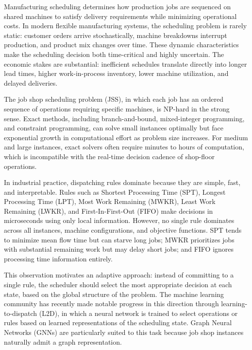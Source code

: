 \documentclass{article}
\begin{document}
Manufacturing scheduling determines how production jobs are sequenced on shared machines to satisfy delivery requirements while minimizing operational costs. In modern flexible manufacturing systems, the scheduling problem is rarely static: customer orders arrive stochastically, machine breakdowns interrupt production, and product mix changes over time. These dynamic characteristics make the scheduling decision both time-critical and highly uncertain. The economic stakes are substantial: inefficient schedules translate directly into longer lead times, higher work-in-process inventory, lower machine utilization, and delayed deliveries.

The job shop scheduling problem (JSS), in which each job has an ordered sequence of operations requiring specific machines, is NP-hard in the strong sense. Exact methods, including branch-and-bound, mixed-integer programming, and constraint programming, can solve small instances optimally but face exponential growth in computational effort as problem size increases. For medium and large instances, exact solvers often require minutes to hours of computation, which is incompatible with the real-time decision cadence of shop-floor operations.

In industrial practice, dispatching rules dominate because they are simple, fast, and interpretable. Rules such as Shortest Processing Time (SPT), Longest Processing Time (LPT), Most Work Remaining (MWKR), Least Work Remaining (LWKR), and First-In-First-Out (FIFO) make decisions in microseconds using only local information. However, no single rule dominates across all instances, machine configurations, and objective functions. SPT tends to minimize mean flow time but can starve long jobs; MWKR prioritizes jobs with substantial remaining work but may delay short jobs; and FIFO ignores processing time information entirely.

This observation motivates an adaptive approach: instead of committing to a single rule, the scheduler should select the most appropriate decision at each state, based on the global structure of the problem. The machine learning community has recently made notable progress in this direction through learning-to-dispatch (L2D), in which a neural network is trained to select operations or rules based on learned representations of the scheduling state. Graph Neural Networks (GNNs) are particularly suited to this task because job shop instances naturally admit a graph representation.
\end{document}

